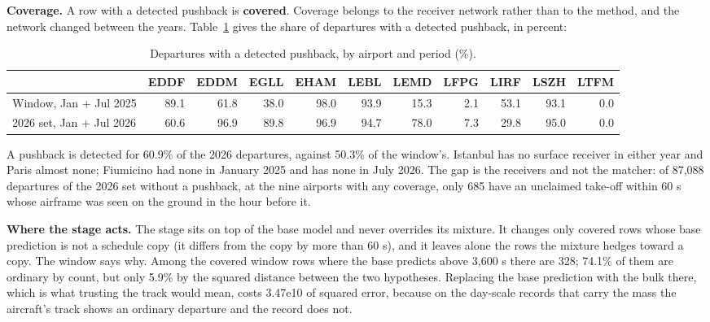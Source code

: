 \documentclass[
  manuscript=article,
  layout=preprint,
  year=2026,
  volume=x,
]{extra/joas}
\begin{document}
\textbf{Coverage.} A row with a detected pushback is \textbf{covered}. Coverage belongs to the receiver network rather than to the method, and the network changed between the years. Table~\ref{tab:9} gives the share of departures with a detected pushback, in percent:

\begin{table}[htbp!]
  \centering
  \small
  \setlength{\tabcolsep}{5pt}\renewcommand{\arraystretch}{1.15}
  \caption{Departures with a detected pushback, by airport and period (\%).}
  \label{tab:9}
  \begin{tabular*}{\linewidth}{@{\extracolsep{\fill}}lrrrrrrrrrr}
  \toprule
   & \textbf{EDDF} & \textbf{EDDM} & \textbf{EGLL} & \textbf{EHAM} & \textbf{LEBL} & \textbf{LEMD} & \textbf{LFPG} & \textbf{LIRF} & \textbf{LSZH} & \textbf{LTFM} \\
  \midrule
  Window, Jan + Jul 2025 & 89.1 & 61.8 & 38.0 & 98.0 & 93.9 & 15.3 & 2.1 & 53.1 & 93.1 & 0.0 \\
  2026 set, Jan + Jul 2026 & 60.6 & 96.9 & 89.8 & 96.9 & 94.7 & 78.0 & 7.3 & 29.8 & 95.0 & 0.0 \\
  \bottomrule
  \end{tabular*}
\end{table}

A pushback is detected for 60.9\% of the 2026 departures, against 50.3\% of the window's. Istanbul has no surface receiver in either year and Paris almost none; Fiumicino had none in January 2025 and has none in July 2026. The gap is the receivers and not the matcher: of 87,088 departures of the 2026 set without a pushback, at the nine airports with any coverage, only 685 have an unclaimed take-off within 60 s whose airframe was seen on the ground in the hour before it.

\textbf{Where the stage acts.} The stage sits on top of the base model and never overrides its mixture. It changes only covered rows whose base prediction is not a schedule copy (it differs from the copy by more than 60 s), and it leaves alone the rows the mixture hedges toward a copy. The window says why. Among the covered window rows where the base predicts above 3,600 s there are 328; 74.1\% of them are ordinary by count, but only 5.9\% by the squared distance between the two hypotheses. Replacing the base prediction with the bulk there, which is what trusting the track would mean, costs 3.47e10 of squared error, because on the day-scale records that carry the mass the aircraft's track shows an ordinary departure and the record does not.
\end{document}
